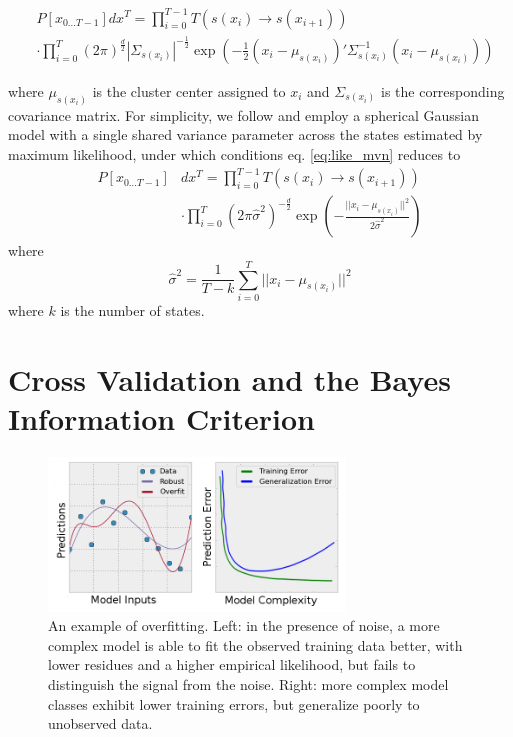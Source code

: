 \documentclass[twocolumn,floatfix,nofootinbib,aps]{revtex4-1}
\begin{document}
\begin{equation}
\label{eq:like_mvn}
\begin{split}
&P[x_{0...T-1}] dx^T = \prod_{i=0}^{T-1} T(s(x_i) \rightarrow s(x_{i+1})) \\
    &\cdot \prod_{i=0}^T \left(2 \pi\right)^\frac{d}{2} |\Sigma_{s(x_i)}|^{-\frac{1}{2}}  \exp\left(-\frac{1}{2} (x_i - \mu_{s(x_i)})' \Sigma_{s(x_i)}^{-1} (x_i - \mu_{s(x_i)})\right)
\end{split}
\end{equation}

where $\mu_{s(x_i)}$ is the cluster center assigned to $x_i$ and $\Sigma_{s(x_i)}$ is the corresponding covariance matrix. For simplicity, we follow \citet{Pelleg2000Xmeans} and employ a spherical Gaussian model with a single shared variance parameter across the states estimated by maximum likelihood, under which conditions eq. \ref{eq:like_mvn} reduces to
\begin{equation}
\label{eq:like_mvn2}
\begin{split}
P[x_{0...T-1}] & dx^T = \prod_{i=0}^{T-1} T(s(x_i) \rightarrow s(x_{i+1})) \\
	&\cdot \prod_{i=0}^T \left(2 \pi \hat{\sigma}^2\right)^{-\frac{d}{2}} \exp\left(-\frac{||x_i - \mu_{s(x_i)}||^2}{2 \hat{\sigma}^2}\right)
\end{split}
\end{equation} where
\begin{equation}
\label{eq:mle_sigma}
\hat{\sigma}^2 = \frac{1}{T - k} \sum_{i=0}^T || x_i - \mu_{s(x_i)} ||^2
\end{equation} where $k$ is the number of states.

\section{Cross Validation and the Bayes Information Criterion}

\begin{figure}
\centering
\includegraphics[width=3.1in]{figs/overfitting.png}
\caption{An example of overfitting. Left: in the presence of noise, a more complex model is able to fit the observed training data better, with lower residues and a higher empirical likelihood, but fails to distinguish the signal from the noise. Right: more complex model classes exhibit lower training errors, but generalize poorly to unobserved data.}
\end{figure}
\end{document}
